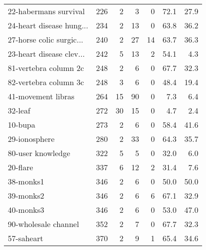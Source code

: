 \begin{table}[h]
\begin{center}
\begin{tabular}{l|r r r r r r}
22-habermans survival & 226 & 2 & 3 & 0 &  72.1 &  27.9\\
24-heart disease hung... & 234 & 2 & 13 & 0 &  63.8 &  36.2\\\hline
27-horse colic surgic... & 240 & 2 & 27 & 14 &  63.7 &  36.3\\
23-heart disease clev... & 242 & 5 & 13 & 2 &  54.1 &   4.3\\
81-vertebra column 2c & 248 & 2 & 6 & 0 &  67.7 &  32.3\\\hline
82-vertebra column 3c & 248 & 3 & 6 & 0 &  48.4 &  19.4\\
41-movement libras & 264 & 15 & 90 & 0 &   7.3 &   6.4\\
32-leaf & 272 & 30 & 15 & 0 &   4.7 &   2.4\\\hline
10-bupa & 273 & 2 & 6 & 0 &  58.4 &  41.6\\
29-ionosphere & 280 & 2 & 33 & 0 &  64.3 &  35.7\\
80-user knowledge & 322 & 5 & 5 & 0 &  32.0 &   6.0\\\hline
20-flare & 337 & 6 & 12 & 2 &  31.4 &   7.6\\
38-monks1 & 346 & 2 & 6 & 0 &  50.0 &  50.0\\
39-monks2 & 346 & 2 & 6 & 6 &  67.1 &  32.9\\\hline
40-monks3 & 346 & 2 & 6 & 0 &  53.0 &  47.0\\
90-wholesale channel & 352 & 2 & 7 & 0 &  67.7 &  32.3\\
57-saheart & 370 & 2 & 9 & 1 &  65.4 &  34.6\\\hline\end{tabular}
\label{tab:nm}
\end{center}
\end{table}